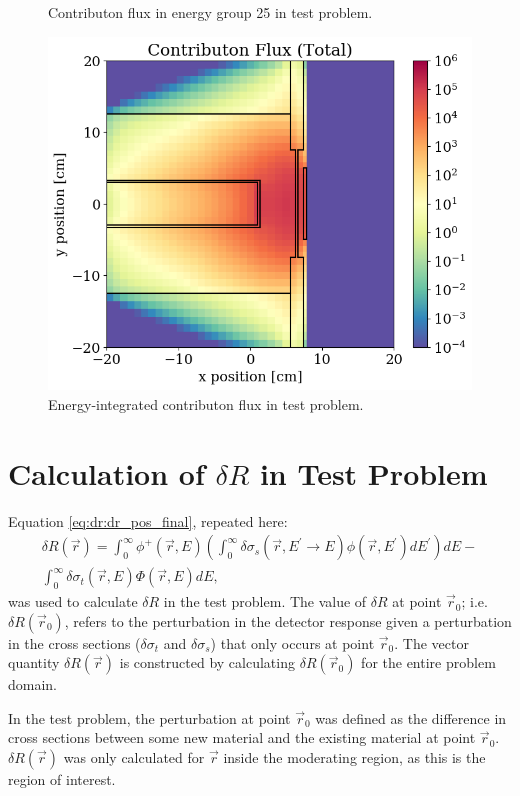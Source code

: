 \begin{figure}
\begin{minipage}{0.495\linewidth}
    \caption{Contributon flux in energy group 25 in test problem.}
    \label{fig:tp:scalar_flux_con_g25}
  \end{minipage}
  \centering
  \includegraphics[width=0.495\linewidth]{content/testprob/scalar_flux_con_total.png}
  \caption{Energy-integrated contributon flux in test problem.}
  \label{fig:tp:scalar_flux_con_total}
\end{figure}

\section{Calculation of $\delta R$ in Test Problem}
\label{sec:bg:tp:dr}

Equation \ref{eq:dr:dr_pos_final}, repeated here:
\begin{multline*}
  \delta R\left(\vec{r}\right) =
  \int_0^\infty\phi^+\left(\vec{r},E\right)\left(\int_0^\infty\delta\sigma_s\left(\vec{r},E^\prime\rightarrow E\right)\phi\left(\vec{r},E^\prime\right)dE^\prime\right)dE - \\
  \int_0^\infty\delta\sigma_t\left(\vec{r},E\right)\Phi\left(\vec{r},E\right)dE,
\end{multline*}
was used to calculate $\delta R$ in the test problem.
The value of $\delta R$ at point $\vec{r}_0$; i.e. $\delta R\left(\vec{r}_0\right)$, refers to the perturbation in the detector response given a perturbation in the cross sections ($\delta \sigma_t$ and $\delta \sigma_s$) that only occurs at point $\vec{r}_0$.
The vector quantity $\delta R\left(\vec{r}\right)$ is constructed by calculating $\delta R\left(\vec{r}_0\right)$ for the entire problem domain.

In the test problem, the perturbation at point $\vec{r}_0$ was defined as the difference in cross sections between some new material and the existing material at point $\vec{r}_0$.
$\delta R\left(\vec{r}\right)$ was only calculated for $\vec{r}$ inside the moderating region, as this is the region of interest.


